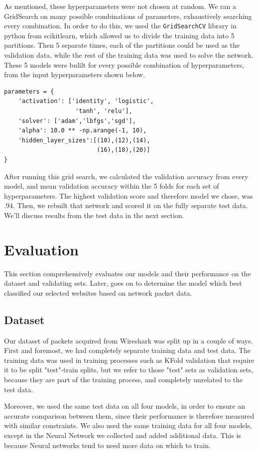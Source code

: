 \documentclass[10pt,sigconf,letterpaper,nonacm]{acmart}
\begin{document}
As mentioned, these hyperparameters were not chosen at random. We ran a GridSearch on many possible combinations of parameters, exhaustively searching every combination. In order to do this, we used the \texttt{GridSearchCV} library in python from scikitlearn, which allowed us to divide the training data into 5 partitions. Then 5 separate times, each of the partitions could be used as the validation data, while the rest of the training data was used to solve the network. These 5 models were bulilt for every possible combination of hyperparameters, from the input hyperparameters shown below.

\begin{verbatim}
parameters = {
    'activation': ['identity', 'logistic', 
                    'tanh', 'relu'],
    'solver': ['adam','lbfgs','sgd'],
    'alpha': 10.0 ** -np.arange(-1, 10),
    'hidden_layer_sizes':[(10),(12),(14),
                          (16),(18),(20)]
}
\end{verbatim}

After running this grid search, we calculated the validation accuracy from every model, and mean validation accuracy within the 5 folds for each set of hyperparameters. The highest validation score and therefore model we chose, was $.94$. 
Then, we rebuilt that network and scored it on the fully separate test data. We'll discuss results from the test data in the next section.

\section{Evaluation}
This section comprehensively evaluates our models and their performance on the dataset and validating sets. Later, goes on to determine the model which best classified our selected websites based on network packet data.

\subsection{Dataset}
Our dataset of packets acquired from Wireshark was split up in a couple of ways. First and foremost, we had completely separate training data and test data. The training data was used in training processes such as KFold validation that require it to be split "test"-train splits, but we refer to those "test" sets as validation sets, because they are part of the training process, and completely unrelated to the test data.

Moreover, we used the same test data on all four models, in order to ensure an accurate comparison between them, since their performance is therefore measured with similar constraints.
We also used the same training data for all four models, except in the Neural Network we collected and added additional data. This is because Neural networks tend to need more data on which to train.
\end{document}
